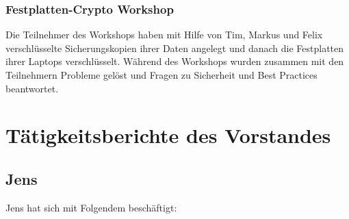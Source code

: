 \documentclass[ngerman]{scrartcl}
\begin{document}
\subsubsection{Festplatten-Crypto Workshop}

Die Teilnehmer des Workshops haben mit Hilfe von Tim, Markus und Felix
verschlüsselte Sicherungskopien ihrer Daten angelegt und danach die Festplatten
ihrer Laptops verschlüsselt. Während des Workshops wurden zusammen mit den
Teilnehmern Probleme gelöst und Fragen zu Sicherheit und Best Practices
beantwortet. 



\section{Tätigkeitsberichte des Vorstandes}

\subsection{Jens}

Jens hat sich mit Folgendem beschäftigt:
\end{document}
